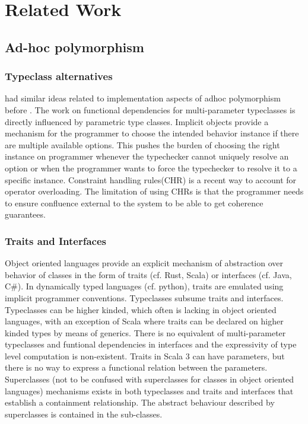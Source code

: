 \documentclass[screen,nonacm]{acmart}
\begin{document}
\section{Related Work}\label{sec:related-work}
\subsection{Ad-hoc polymorphism}\label{sec:rw-adhoc-poly}
\subsubsection{Typeclass alternatives}
\citet{kaes_parametric_1988} had similar ideas related to
implementation aspects of adhoc polymorphism before
\citet{wadler_polymorphism_1989}. The work on functional dependencies
for multi-parameter typeclasses is directly influenced by parametric
type classes\cite{chen_parametric_1992}. Implicit
objects\cite{oliveira_typeclasses_2010} provide a mechanism for the
programmer to choose the intended behavior instance if
there are multiple available options. This pushes the burden of choosing the
right instance on programmer whenever the typechecker cannot uniquely
resolve an option or when the programmer wants to force the
typechecker to resolve it to a specific instance. Constraint handling
rules(CHR)\cite{fruhwirth_theory_1998,stuckey_theory_2005} is a recent
way to account for operator overloading. The limitation of using CHRs
is that the programmer needs to ensure confluence external to the
system to be able to get coherence guarantees.

\subsubsection{Traits and Interfaces}
Object oriented languages provide an explicit mechanism of abstraction
over behavior of classes in the form of traits (cf. Rust, Scala) or
interfaces (cf. Java, C\#). In dynamically typed languages
(cf. python), traits are emulated using implicit programmer
conventions. Typeclasses subsume traits and interfaces. Typeclasses
can be higher kinded, which often is lacking in object oriented
languages, with an exception of Scala where traits can be declared on
higher kinded types by means of generics. There is no equivalent of
multi-parameter typeclasses and funtional dependencies in interfaces
and the expressivity of type level computation is non-existent. Traits
in Scala 3 can have parameters, but there is no way to express a
functional relation between the parameters. Superclasses (not to be
confused with superclasses for classes in object oriented languages)
mechanisms exists in both typeclasses and traits and interfaces that
establish a containment relationship. The abstract behaviour described
by superclasses is contained in the sub-classes.
\end{document}
